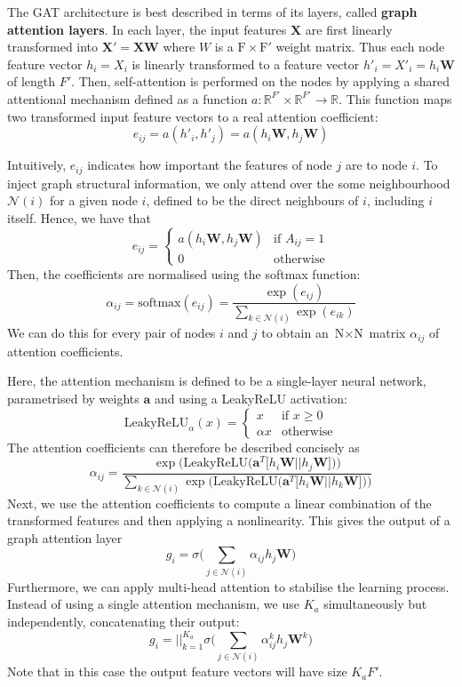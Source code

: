 \documentclass[12pt]{article}
\theoremstyle{definition}
\begin{document}
\bigskip

The GAT architecture is best described in terms of its layers, called \textbf{graph attention layers}. In each layer, the input features $\textbf{X}$ are first linearly transformed into $\textbf{X}' = \textbf{X}\textbf{W}$ where $W$ is a $\textrm{F} \times \textrm{F}'$ weight matrix. Thus each node feature vector $h_i = X_i$ is linearly transformed to a feature vector $h'_i = X'_i = h_i \textbf{W}$ of length $F'$. Then, self-attention is performed on the nodes by applying a shared attentional mechanism defined as a function $a: \mathbb{R}^{F'} \times \mathbb{R}^{F'} \to \mathbb{R}$. This function maps two transformed input feature vectors to a real attention coefficient:
\[
e_{ij} = a(h'_i, h'_j) = a(h_i \textbf{W}, h_j \textbf{W})
\]

Intuitively, $e_{ij}$ indicates how important the features of node $j$ are to node $i$. To inject graph structural information, we only attend over the some neighbourhood $\mathcal{N}(i)$ for a given node $i$, defined to be the direct neighbours of $i$, including $i$ itself. Hence, we have that
\begin{equation*}
e_{ij} = \begin{cases}
				a(h_i \textbf{W}, h_j \textbf{W}) &\text{if $A_{ij} = 1$}\\
				0 &\text{otherwise}
			\end{cases}
\end{equation*}
Then, the coefficients are normalised using the softmax function:
\[
\alpha_{ij} = \textrm{softmax}(e_{ij}) = \frac{\exp(e_{ij})}{\sum_{k \in \mathcal{N}(i)} \exp(e_{ik})}
\]
We can do this for every pair of nodes $i$ and $j$ to obtain an $\textrm{N} \times \textrm{N}$ matrix $\alpha_{ij}$ of attention coefficients.

Here, the attention mechanism is defined to be a single-layer neural network, parametrised by weights $\textbf{a}$ and using a LeakyReLU activation: 
\[
\textrm{LeakyReLU}_{\alpha}(x) = 
	\begin{cases}
		x &\text{if $x \ge 0$}\\
		\alpha x &\text{otherwise}
	\end{cases}
\]
The attention coefficients can therefore be described concisely as
\[
\alpha_{ij} = \frac{\exp \big( \textrm{LeakyReLU}\big( \textbf{a}^T \big[ h_i \textbf{W} \vert\vert h_j \textbf{W} \big] \big) \big)}
{
\sum_{k \in \mathcal{N}(i)} \exp \big( \textrm{LeakyReLU}\big( \textbf{a}^T \big[ h_i \textbf{W} \vert\vert h_k \textbf{W} \big] \big) \big)
}
\]
Next, we use the attention coefficients to compute a linear combination of the transformed features and then applying a nonlinearity. This gives the output of a graph attention layer
\[
g_i = \sigma \big( \sum_{j \in \mathcal{N}(i)} \alpha_{ij} h_j \textbf{W} \big)
\]
Furthermore, we can apply multi-head attention to stabilise the learning process. Instead of using a single attention mechanism, we use $K_a$ simultaneously but independently, concatenating their output:
\[
g_i = {\Big\vert\Big\vert}_{k=1}^{K_a} \sigma \big( \sum_{j \in \mathcal{N}(i)} \alpha_{ij}^k h_j \textbf{W}^k \big)
\]
Note that in this case the output feature vectors will have size $K_a F'$.
\end{document}
